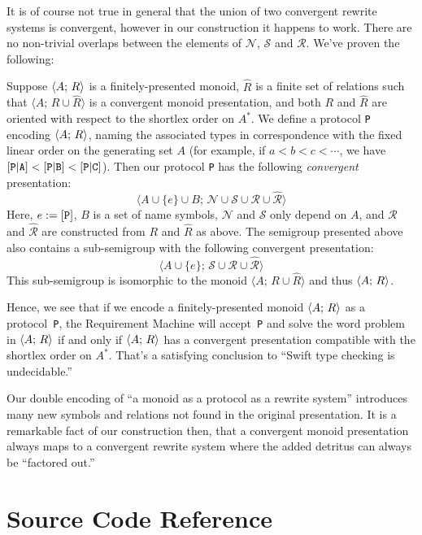 \documentclass[../generics]{subfiles}
\begin{document}
\begin{example}
It is of course not true in general that the union of two convergent rewrite systems is convergent, however in our construction it happens to work. There are no non-trivial overlaps between the elements of $\mathcal{N}$, $\mathcal{S}$ and $\mathcal{R}$. We've proven the following:
\begin{theorem}
Suppose $\langle A;\,R\rangle$ is a finitely-presented monoid, $\hat{R}$ is a finite set of relations such that $\langle A;\,R\cup\hat{R}\rangle$ is a convergent monoid presentation, and both $R$ and $\hat{R}$ are oriented with respect to the shortlex order on $A^*$. We define a protocol \texttt{P} encoding $\langle A;\,R\rangle$, naming the associated types in correspondence with the fixed linear order on the generating set $A$ (for example, if $a<b<c<\cdots$, we have $[\texttt{P}|\texttt{A}]<[\texttt{P}|\texttt{B}]<[\texttt{P}|\texttt{C}]$). Then our protocol \texttt{P} has the following \emph{convergent} presentation:
\[\langle A\cup\{e\}\cup B;\,\mathcal{N}\cup\mathcal{S}\cup\mathcal{R}\cup\hat{\mathcal{R}}\rangle\]
Here, $e:=[\texttt{P}]$, $B$ is a set of name symbols, $\mathcal{N}$ and $\mathcal{S}$ only depend on $A$, and $\mathcal{R}$ and $\hat{\mathcal{R}}$ are constructed from $R$ and $\hat{R}$ as above. The semigroup presented above also contains a sub-semigroup with the following convergent presentation:
\[\langle A\cup\{e\};\,\mathcal{S}\cup\mathcal{R}\cup\hat{\mathcal{R}}\rangle\]
This sub-semigroup is isomorphic to the monoid $\langle A;\,R\cup\hat{R}\rangle$ and thus $\langle A;\,R\rangle$.
\end{theorem}

Hence, we see that if we encode a finitely-presented monoid $\langle A;\,R\rangle$ as a protocol~\texttt{P}, the Requirement Machine will accept~\texttt{P} and solve the word problem in $\langle A;\,R\rangle$ if and only if $\langle A;\,R\rangle$ has a convergent presentation compatible with the shortlex order on $A^*$. That's a satisfying conclusion to ``Swift type checking is undecidable.''

Our double encoding of ``a monoid as a protocol as a rewrite system'' introduces many new symbols and relations not found in the original presentation. It is a remarkable fact of our construction then, that a convergent monoid presentation always maps to a convergent rewrite system where the added detritus can always be ``factored out.''
\end{example}

\section{Source Code Reference}\label{completion sourceref}
\end{document}
